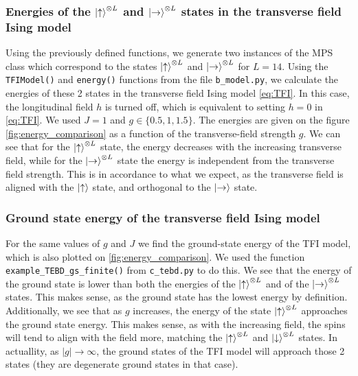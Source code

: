 \subsubsection{Energies of the $\ket{\uparrow}^{\otimes L}$ and $\ket{\rightarrow}^{\otimes L}$ states in the transverse field Ising model}
Using the previously defined functions, we generate two instances of the MPS class which correspond to the states $\ket{\uparrow}^{\otimes L}$ and $\ket{\rightarrow}^{\otimes L}$ for $L = 14$. Using the \texttt{TFIModel()} and \texttt{energy()} functions from the file \texttt{b\_model.py}, we calculate the energies of these 2 states in the transverse field Ising model \ref{eq:TFI}. In this case, the longitudinal field $h$ is turned off, which is equivalent to setting $h=0$ in \ref{eq:TFI}. We used $J = 1$ and $g\in\{0.5, 1, 1.5\}$. The energies are given on the figure \ref{fig:energy_comparison} as a function of the transverse-field strength $g$. We can see that for the $\ket{\uparrow}^{\otimes L}$ state, the energy decreases with the increasing transverse field, while for the $\ket{\rightarrow}^{\otimes L}$ state the energy is independent from the transverse field strength. This is in accordance to what we expect, as the transverse field is aligned with the $\ket{\uparrow}$ state, and orthogonal to the $\ket{\rightarrow}$ state.

\subsubsection{Ground state energy of the transverse field Ising model}
For the same values of $g$ and $J$ we find the ground-state energy of the TFI model, which is also plotted on \ref{fig:energy_comparison}. We used the function \texttt{example\_TEBD\_gs\_finite()} from \texttt{c\_tebd.py} to do this. We see that the energy of the ground state is lower than both the energies of the $\ket{\uparrow}^{\otimes L}$ and of the $\ket{\rightarrow}^{\otimes L}$ states. This makes sense, as the ground state has the lowest energy by definition. Additionally, we see that as $g$ increases, the energy of the state $\ket{\uparrow}^{\otimes L}$ approaches the ground state energy. This makes sense, as with the increasing field, the spins will tend to align with the field more, matching the $\ket{\uparrow}^{\otimes L}$ and $\ket{\downarrow}^{\otimes L}$ states. In actuallity, as $|g|\rightarrow\infty$, the ground states of the TFI model will approach those 2 states (they are degenerate ground states in that case).


